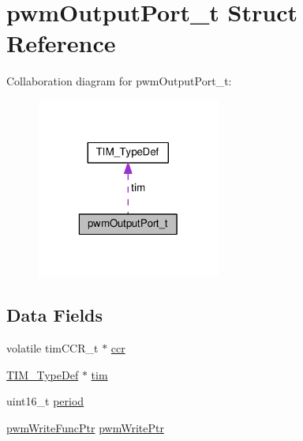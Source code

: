 \hypertarget{structpwmOutputPort__t}{\section{pwm\+Output\+Port\+\_\+t Struct Reference}
\label{structpwmOutputPort__t}
}


Collaboration diagram for pwm\+Output\+Port\+\_\+t\+:\nopagebreak
\begin{figure}[H]
\begin{center}
\leavevmode
\includegraphics[width=172pt]{structpwmOutputPort__t__coll__graph}
\end{center}
\end{figure}
\subsection*{Data Fields}
\begin{DoxyCompactItemize}
\item 
volatile tim\+C\+C\+R\+\_\+t $\ast$ \hyperlink{structpwmOutputPort__t_aceca272a692eab6366adf18bc638faa2}{ccr}
\item 
\hyperlink{structTIM__TypeDef}{T\+I\+M\+\_\+\+Type\+Def} $\ast$ \hyperlink{structpwmOutputPort__t_af302ace40a383a0ec8cc3818555af13d}{tim}
\item 
uint16\+\_\+t \hyperlink{structpwmOutputPort__t_a17278e53cefe809d10acc1aa369544d3}{period}
\item 
\hyperlink{pwm__output_8c_a239e412c1ddcea4259fe3adc016cc55d}{pwm\+Write\+Func\+Ptr} \hyperlink{structpwmOutputPort__t_ae9bd21fdfb297c2898fb959ca84b992d}{pwm\+Write\+Ptr}
\end{DoxyCompactItemize}


